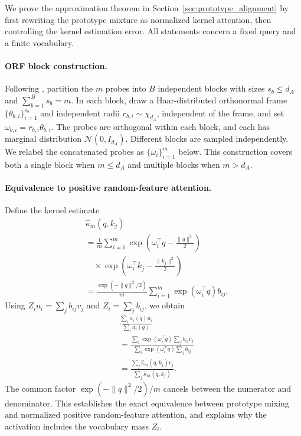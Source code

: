 \documentclass[11pt]{article}
\begin{document}
We prove the approximation theorem in Section~\ref{sec:prototype_alignment} by first rewriting the prototype mixture as normalized kernel attention, then controlling the kernel estimation error. All statements concern a fixed query and a finite vocabulary.

\paragraph{ORF block construction.}
Following \citet{performer}, partition the $m$ probes into $B$ independent blocks with sizes $s_b\leq d_A$ and $\sum_{b=1}^{B}s_b=m$. In each block, draw a Haar-distributed orthonormal frame $\{\theta_{b,i}\}_{i=1}^{s_b}$ and independent radii $r_{b,i}\sim\chi_{d_A}$, independent of the frame, and set $\omega_{b,i}=r_{b,i}\theta_{b,i}$. The probes are orthogonal within each block, and each has marginal distribution $\mathcal{N}(0,I_{d_A})$. Different blocks are sampled independently. We relabel the concatenated probes as $\{\omega_i\}_{i=1}^{m}$ below. This construction covers both a single block when $m\leq d_A$ and multiple blocks when $m>d_A$.

\paragraph{Equivalence to positive random-feature attention.}
Define the kernel estimate
\begin{equation}
\begin{aligned}
    &\widehat{\kappa}_m(q,k_j) \\
    &=\frac{1}{m}\sum_{i=1}^{m}
      \exp\!\left(\omega_i^\top q-\frac{\|q\|^2}{2}\right) \\
    &\quad\times
      \exp\!\left(\omega_i^\top k_j-\frac{\|k_j\|^2}{2}\right) \\
    &=\frac{\exp(-\|q\|^2/2)}{m}
      \sum_{i=1}^{m}\exp(\omega_i^\top q)b_{ij}.
\end{aligned}
\label{eq:prototype_kernel_estimator}
\end{equation}
Using $Z_i u_i=\sum_j b_{ij}v_j$ and $Z_i=\sum_j b_{ij}$, we obtain
\begin{equation}
\begin{aligned}
    &\frac{\sum_i a_i(q)u_i}{\sum_i a_i(q)} \\
    &=\frac{\sum_i\exp(\omega_i^\top q)\sum_j b_{ij}v_j}
            {\sum_i\exp(\omega_i^\top q)\sum_j b_{ij}} \\
    &=\frac{\sum_j\widehat{\kappa}_m(q,k_j)v_j}
            {\sum_j\widehat{\kappa}_m(q,k_j)}.
\end{aligned}
\label{eq:prototype_attention_equivalence}
\end{equation}
The common factor $\exp(-\|q\|^2/2)/m$ cancels between the numerator and denominator. This establishes the exact equivalence between prototype mixing and normalized positive random-feature attention, and explains why the activation includes the vocabulary mass $Z_i$.
\end{document}
